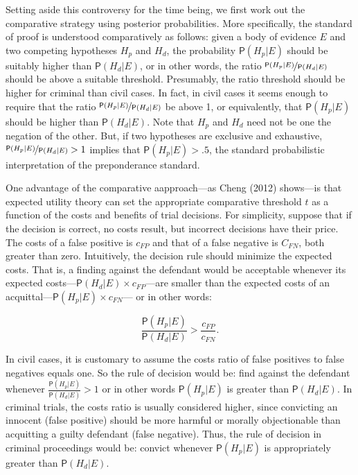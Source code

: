 \documentclass[
  10pt,
  dvipsnames,enabledeprecatedfontcommands]{scrartcl}
\newcommand{\pr}[1]{\ensuremath{\mathsf{P}(#1)}}
\begin{document}
Setting aside this controversy for the time being, we first work out the
comparative strategy using posterior probabilities. More specifically,
the standard of proof is understood comparatively as follows: given a
body of evidence \(E\) and two competing hypotheses \(H_p\) and \(H_d\),
the probability \(\pr{H_p \vert E}\) should be suitably higher than
\(\pr{H_d \vert E}\), or in other words, the ratio
\(\nicefrac{\pr{H_p \vert E}}{\pr{H_d \vert E}}\) should be above a
suitable threshold. Presumably, the ratio threshold should be higher for
criminal than civil cases. In fact, in civil cases it seems enough to
require that the ratio \(\nicefrac{\pr{H_p \vert E}}{\pr{H_d \vert E}}\)
be above 1, or equivalently, that \(\pr{H_p \vert E}\) should be higher
than \(\pr{H_d \vert E}\). Note that \(H_p\) and \(H_d\) need not be one
the negation of the other. But, if two hypotheses are exclusive and
exhaustive, \(\nicefrac{\pr{H_p \vert E}}{\pr{H_d \vert E}}>1\) implies
that \(\pr{H_p \vert E}>.5\), the standard probabilistic interpretation
of the preponderance standard.

One advantage of the comparative aapproach---as Cheng (2012) shows---is
that expected utility theory can set the appropriate comparative
threshold \(t\) as a function of the costs and benefits of trial
decisions. For simplicity, suppose that if the decision is correct, no
costs result, but incorrect decisions have their price.
 The costs of a false positive is
\(c_{FP}\) and that of a false negative is \(C_{FN}\), both greater than
zero. Intuitively, the decision rule should minimize the expected costs.
That is, a finding against the defendant would be acceptable whenever
its expected costs---\(\pr{H_d \vert E} \times c_{FP}\)---are smaller
than the expected costs of an
acquittal---\(\pr{H_p \vert E}\times c_{FN}\)--- or in other words:

\[\frac{\pr{H_p \vert E}}{\pr{H_d \vert E}} > \frac{c_{FP}}{c_{FN}}.\]

\noindent In civil cases, it is customary to assume the costs ratio of
false positives to false negatives equals one. So the rule of decision
would be: find against the defendant whenever
\(\frac{\pr{H_p \vert E}}{\pr{H_d \vert E}} > 1\) or in other words
\(\pr{H_p \vert E}\) is greater than \(\pr{H_d \vert E}\). In criminal
trials, the costs ratio is usually considered higher, since convicting
an innocent (false positive) should be more harmful or morally
objectionable than acquitting a guilty defendant (false negative). Thus,
the rule of decision in criminal proceedings would be: convict whenever
\(\pr{H_p \vert E}\) is appropriately greater than \(\pr{H_d \vert E}\).
\end{document}
